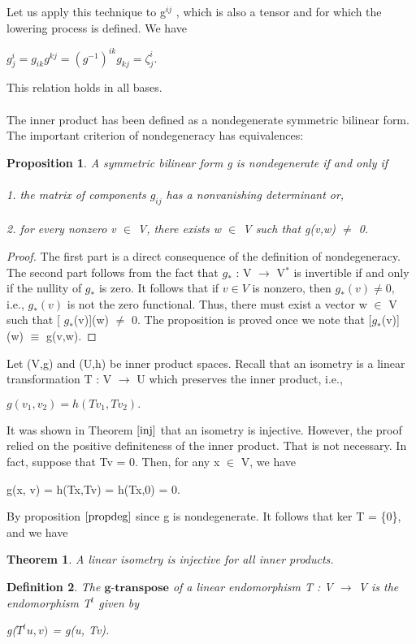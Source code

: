 \documentclass[12pt,a4paper]{article}
\newtheorem{thm}{Theorem}
\newtheorem{defn}[thm]{Definition}
\newtheorem{prop}{Proposition}
\begin{document}
Let us apply this technique to g$^{ij}$ , which is also a tensor and for which
the lowering process is defined. We have
\begin{center}
$g^i_j = g_{ik}g^{kj} = (g^{-1})^{ik} g_{kj} = \zeta_j^i$.
\end{center}
This relation holds in all bases.\\
\\
The inner product has been defined as a nondegenerate symmetric bilinear form. The important criterion of nondegeneracy has equivalences:
\begin{prop} \label{propdeg}
A symmetric bilinear form g is nondegenerate if
and only if\\ \\
1. the matrix of components $g_{ij}$ has a nonvanishing determinant or,\\ \\
2. for every nonzero v $\in$ V, there exists w $\in$ V such that g(v,w) $\ne$ 0.
\end{prop}
\begin{proof}
The first part is a direct consequence of the definition of nondegeneracy. The second part follows from the fact that $g_*$ : V $\to$ V$^*$ is invertible if and only if the nullity of $g_*$ is zero.  It follows that if $v \in V$ is nonzero, then $g_*(v) \ne 0,$ i.e., $g_*(v)$ is not the zero functional. Thus, there must exist a
vector w $\in$ V such that [ $g_*$(v)](w) $\ne$ 0. The proposition is proved once we
note that [$g_*$(v)](w) $\equiv$ g(v,w).
\end{proof}
Let (V,g) and (U,h) be inner product spaces. Recall that an isometry is
a linear transformation T : V $\to$ U which preserves the inner product, i.e.,
\begin{center}
$g(v_1, v_2) = h(T v_1, T v_2).$
\end{center}
It was shown in Theorem $\ref{inj}$ that  an isometry is injective. However, the
proof relied on the positive definiteness of the inner product. That is not
necessary. In fact, suppose that Tv = 0. Then, for any x $\in$ V, we have
\begin{center}
g(x, v) = h(Tx,Tv) = h(Tx,0) = 0.
\end{center}
By proposition $\ref{propdeg}$ since g is nondegenerate. It follows that
ker T = \{0\}, and we have
\begin{thm}
A linear isometry is injective for all inner products.
\end{thm}
\begin{defn}
The $\textbf{g-transpose}$ of a linear endomorphism T : V $\to$ V is
the endomorphism T$^t$ given by
\begin{center}
g($T^t u, v)$ = g(u, Tv).
\end{center}
\end{defn}
\end{document}

